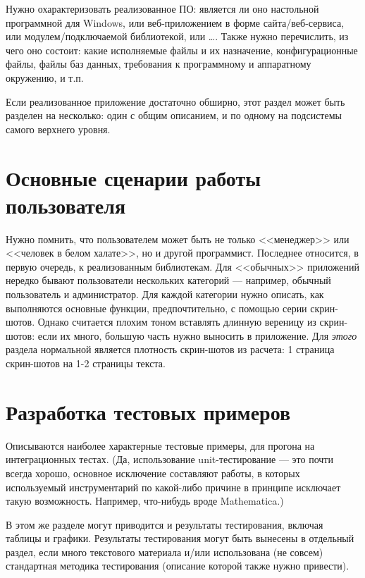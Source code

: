 Нужно охарактеризовать реализованное ПО: является ли оно настольной программной для Windows, или веб-приложением в форме сайта/веб-сервиса, или модулем/подключаемой библиотекой, или \dots. Также нужно перечислить, из чего оно состоит: какие исполняемые файлы и их назначение, конфигурационные файлы, файлы баз данных, требования к программному и аппаратному окружению, и т.п.

Если реализованное приложение достаточно обширно, этот раздел может быть
разделен на несколько: один с общим описанием, и по одному на подсистемы самого
верхнего уровня.



\section{Основные сценарии работы пользователя}

Нужно помнить, что пользователем может быть не только <<менеджер>> или <<человек в белом халате>>, но и другой программист. Последнее относится, в первую очередь, к реализованным библиотекам. Для <<обычных>> приложений нередко бывают пользователи нескольких категорий --- например, обычный пользователь и администратор. Для каждой категории нужно описать, как выполняются основные функции, предпочтительно, с помощью серии скрин-шотов. Однако считается плохим тоном вставлять длинную вереницу из скрин-шотов: если их много, большую часть нужно выносить в приложение. Для \textit{этого} раздела нормальной является плотность скрин-шотов из расчета: 1 страница скрин-шотов на 1-2 страницы текста.





\section{Разработка тестовых примеров}

Описываются наиболее характерные тестовые примеры, для прогона на интеграционных тестах. (Да, использование unit-тестирование --- это почти всегда хорошо, основное исключение составляют работы, в которых используемый инструментарий по какой-либо причине в принципе исключает такую возможность. Например, что-нибудь вроде Mathematica.)

В этом же разделе могут приводится и результаты тестирования, включая таблицы и
графики. Результаты тестирования могут быть вынесены в отдельный раздел, если
много текстового материала и/или использована (не совсем) стандартная методика
тестирования (описание которой также нужно привести).

